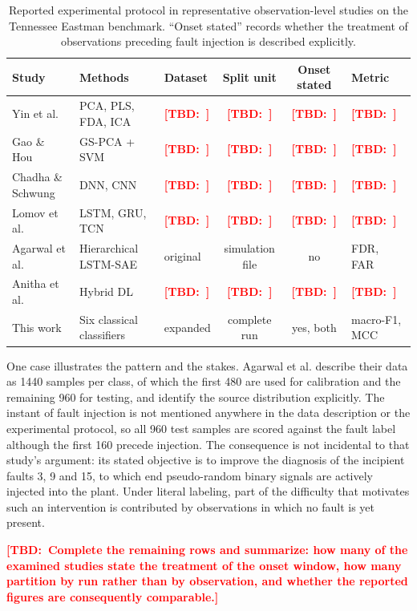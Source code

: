 \documentclass[10pt,twocolumn,a4paper]{article}
\newcommand{\TBD}[1]{\textcolor{red}{\textbf{[TBD:~#1]}}}
\begin{document}
\begin{table}[t]
\centering
\caption{Reported experimental protocol in representative observation-level
studies on the Tennessee Eastman benchmark. ``Onset stated'' records whether
the treatment of observations preceding fault injection is described
explicitly.}
\label{tab:survey}
\small
\begin{tabular}{lllccl}
\toprule
Study & Methods & Dataset & Split unit & Onset stated & Metric\\
\midrule
Yin et al. \cite{yin2012comparison}      & PCA, PLS, FDA, ICA & \TBD{} & \TBD{} & \TBD{} & \TBD{}\\
Gao \& Hou \cite{gao2016svm}             & GS-PCA + SVM       & \TBD{} & \TBD{} & \TBD{} & \TBD{}\\
Chadha \& Schwung \cite{chadha2017comparison} & DNN, CNN      & \TBD{} & \TBD{} & \TBD{} & \TBD{}\\
Lomov et al. \cite{lomov2021temporal}    & LSTM, GRU, TCN     & \TBD{} & \TBD{} & \TBD{} & \TBD{}\\
Agarwal et al. \cite{agarwal2022lstm}    & Hierarchical LSTM-SAE & original & simulation file & no & FDR, FAR\\
Anitha et al. \cite{anitha2023imvoa}     & Hybrid DL          & \TBD{} & \TBD{} & \TBD{} & \TBD{}\\
\midrule
This work & Six classical classifiers & expanded & complete run & yes, both & macro-F1, MCC\\
\bottomrule
\end{tabular}
\end{table}

One case illustrates the pattern and the stakes. Agarwal et al.
\cite{agarwal2022lstm} describe their data as 1440 samples per class, of which
the first 480 are used for calibration and the remaining 960 for testing, and
identify the source distribution explicitly. The instant of fault injection is
not mentioned anywhere in the data description or the experimental protocol, so
all 960 test samples are scored against the fault label although the first 160
precede injection. The consequence is not incidental to that study's argument:
its stated objective is to improve the diagnosis of the incipient faults 3, 9
and 15, to which end pseudo-random binary signals are actively injected into
the plant. Under literal labeling, part of the difficulty that motivates such
an intervention is contributed by observations in which no fault is yet
present.

\TBD{Complete the remaining rows and summarize: how many of the examined
studies state the treatment of the onset window, how many partition by run
rather than by observation, and whether the reported figures are consequently
comparable.}
\end{document}
